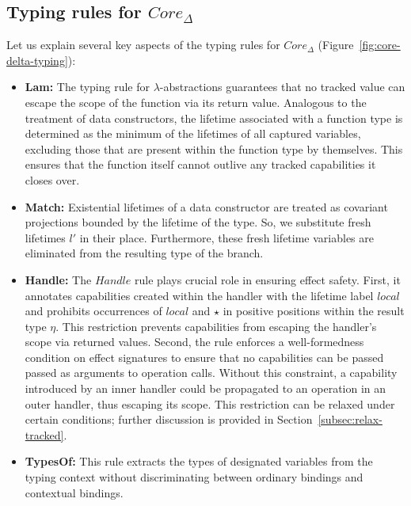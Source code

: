 \documentclass[acmsmall,review,screen]{acmart}
\begin{document}
\subsection{Typing rules for $Core_\Delta$}

Let us explain several key aspects of the typing rules for $Core_\Delta$ (Figure\ \ref{fig:core-delta-typing}):
\begin{itemize}
    \item \textbf{Lam:} The typing rule for $\lambda$-abstractions guarantees that no tracked value can escape the scope of the function via its return value.
    Analogous to the treatment of data constructors, the lifetime associated with a function type is determined as the minimum of the lifetimes of all captured variables, excluding those that are present within the function type by themselves.
    This ensures that the function itself cannot outlive any tracked capabilities it closes over.
    \item \textbf{Match:}
    Existential lifetimes of a data constructor are treated as covariant projections bounded by the lifetime of the type. %
    So, we substitute fresh lifetimes $l'$ in their place.
    Furthermore, these fresh lifetime variables are eliminated from the resulting type of the branch.
    \item \textbf{Handle:} The $Handle$ rule plays crucial role in ensuring effect safety.
    First, it annotates capabilities created within the handler with the lifetime label $local$ and prohibits occurrences of $local$ and $\star$ in positive positions within the result type $\eta$.
    This restriction prevents capabilities from escaping the handler’s scope via returned values.
    Second, the rule enforces a well-formedness condition on effect signatures to ensure that no capabilities can be passed passed as arguments to operation calls.
    Without this constraint, a capability introduced by an inner handler could be propagated to an operation in an outer handler, thus escaping its scope.
    This restriction can be relaxed under certain conditions; further discussion is provided in Section~\ref{subsec:relax-tracked}.
    \item \textbf{TypesOf:} This rule extracts the types of designated variables from the typing context without discriminating between ordinary bindings and contextual bindings.
\end{itemize}
\end{document}

